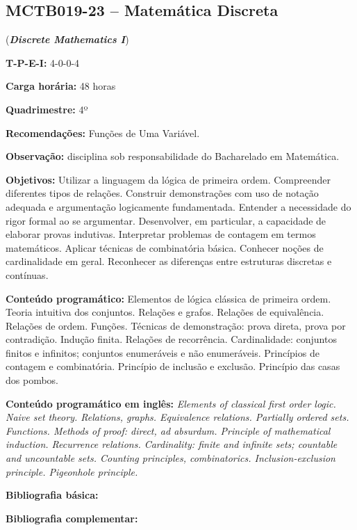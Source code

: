 \documentclass[class=article, crop=false]{standalone}
\begin{document}
\subsection*{MCTB019-23 -- Matemática Discreta}
\label{disc:mdI}

(\textbf{\textit{Discrete Mathematics I}})

\begin{center}
	\begin{minipage}{0.85\textwidth}
		\textbf{T-P-E-I:} 4-0-0-4

		\textbf{Carga horária:} 48 horas

		\textbf{Quadrimestre:} 4º

		\textbf{Recomendações:} Funções de Uma Variável.

        \textbf{Observação:} disciplina sob responsabilidade do Bacharelado em Matemática.
	\end{minipage}
\end{center}

\textbf{Objetivos:}
Utilizar a linguagem da lógica de primeira ordem. Compreender diferentes tipos
de relações.  Construir demonstrações com uso de notação adequada e
argumentação logicamente fundamentada. Entender a necessidade do rigor formal
ao se argumentar. Desenvolver, em particular, a capacidade de elaborar provas
indutivas. Interpretar problemas de contagem em termos matemáticos. Aplicar
técnicas de combinatória básica. Conhecer noções de cardinalidade em geral.
Reconhecer as diferenças entre estruturas discretas e contínuas.


\textbf{Conteúdo programático:}
Elementos de lógica clássica de primeira ordem. Teoria intuitiva dos conjuntos.
Relações e grafos. Relações de equivalência. Relações de ordem. Funções.
Técnicas de demonstração: prova direta, prova por contradição. Indução finita.
Relações de recorrência.  Cardinalidade: conjuntos finitos e infinitos;
conjuntos enumeráveis e não enumeráveis.  Princípios de contagem e
combinatória. Princípio de inclusão e exclusão. Princípio das casas dos pombos.


\textbf{Conteúdo programático em inglês:}
\textit{Elements of classical first order logic. Naive set theory. Relations,
graphs. Equivalence relations. Partially ordered sets. Functions. Methods of
proof: direct, ad absurdum. Principle of mathematical induction. Recurrence
relations. Cardinality: finite and infinite sets; countable and uncountable
sets. Counting principles, combinatorics. Inclusion-exclusion principle.
Pigeonhole principle.}

\newrefsection
\textbf{Bibliografia básica:}
\nocite{2004-grimaldi, 2009-rosen, 2016-scheinerman}
\printbibliography

\newrefsection
\textbf{Bibliografia complementar:}
\nocite{2003-lovasz-etal, 2007-santos-etal, 2001-halmos, 2009-matousek-nesetril, 2013-stein-etal, 2006-velleman, 2017-bona}
\printbibliography
\end{document}
